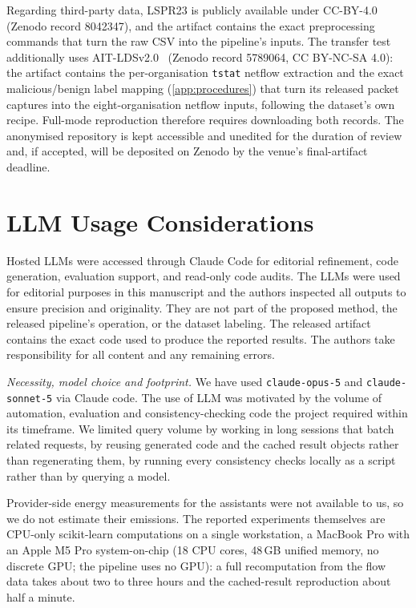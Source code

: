 \documentclass[conference]{IEEEtran}
\begin{document}
Regarding third-party data, LSPR23 is publicly available under CC-BY-4.0 (Zenodo record 8042347), and the artifact contains the
exact preprocessing commands that turn the raw CSV into the pipeline's inputs. The transfer test
additionally uses AIT-LDSv2.0~\cite{aitlds} (Zenodo record 5789064, CC BY-NC-SA 4.0): the artifact contains the
per-organisation \texttt{tstat} netflow extraction and the exact malicious/benign label mapping
(\cref{app:procedures}) that turn its released packet captures into the eight-organisation netflow inputs,
following the dataset's own recipe. Full-mode reproduction therefore requires downloading both records.
The anonymised repository is kept accessible and unedited for the duration of review and, if accepted,
will be deposited on Zenodo by the venue's final-artifact deadline.

\section*{LLM Usage Considerations}

Hosted LLMs were accessed through Claude Code for editorial refinement, code generation,
evaluation support, and read-only code audits. The LLMs were used for editorial purposes in this manuscript 
and the authors inspected all outputs to ensure precision and originality. They are not part of
the proposed method, the released pipeline's operation, or the dataset labeling.  The released artifact
contains the exact code used to produce the reported results. The authors take responsibility for all
content and any remaining errors.

\emph{Necessity, model choice and footprint.} We have used \texttt{claude-opus-5} and \texttt{claude-sonnet-5} via Claude code. The use of LLM was motivated
by the volume of automation, evaluation and consistency-checking code the project required within its
timeframe. We limited query
volume by working in long sessions
that batch related requests, by reusing generated code and the cached result objects rather than
regenerating them, by running every consistency checks locally as a script rather than by querying a model. 

Provider-side energy
measurements for the assistants were not available to us, so we do not estimate their emissions. The
reported experiments themselves are CPU-only scikit-learn computations on a single workstation, a
MacBook Pro with an Apple M5 Pro system-on-chip (18 CPU cores, 48\,GB unified memory, no discrete GPU;
the pipeline uses no GPU): a full recomputation from the flow data takes about two to three hours and
the cached-result reproduction about half a minute.
\end{document}
